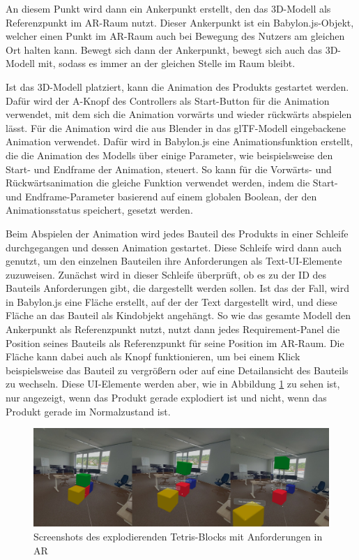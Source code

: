 An diesem Punkt wird dann ein Ankerpunkt erstellt, den das 3D-Modell als Referenzpunkt im AR-Raum nutzt.
Dieser Ankerpunkt ist ein Babylon.js-Objekt, welcher einen Punkt im AR-Raum auch bei Bewegung des Nutzers am gleichen Ort halten kann.
Bewegt sich dann der Ankerpunkt, bewegt sich auch das 3D-Modell mit, sodass es immer an der gleichen Stelle im Raum bleibt.


Ist das 3D-Modell platziert, kann die Animation des Produkts gestartet werden.
Dafür wird der A-Knopf des Controllers als Start-Button für die Animation verwendet, mit dem sich die Animation vorwärts und wieder rückwärts abspielen lässt.
Für die Animation wird die aus Blender in das glTF-Modell eingebackene Animation verwendet.
Dafür wird in Babylon.js eine Animationsfunktion erstellt, die die Animation des Modells über einige Parameter, wie beispielsweise den Start- und Endframe der Animation, steuert.
So kann für die Vorwärts- und Rückwärtsanimation die gleiche Funktion verwendet werden, indem die Start- und Endframe-Parameter basierend auf einem globalen Boolean, der den Animationsstatus speichert, gesetzt werden.

Beim Abspielen der Animation wird jedes Bauteil des Produkts in einer Schleife durchgegangen und dessen Animation gestartet.
Diese Schleife wird dann auch genutzt, um den einzelnen Bauteilen ihre Anforderungen als Text-UI-Elemente zuzuweisen.
Zunächst wird in dieser Schleife überprüft, ob es zu der ID des Bauteils Anforderungen gibt, die dargestellt werden sollen.
Ist das der Fall, wird in Babylon.js eine Fläche erstellt, auf der der Text dargestellt wird, und diese Fläche an das Bauteil als Kindobjekt angehängt.
So wie das gesamte Modell den Ankerpunkt als Referenzpunkt nutzt, nutzt dann jedes Requirement-Panel die Position seines Bauteils als Referenzpunkt für seine Position im AR-Raum.
Die Fläche kann dabei auch als Knopf funktionieren, um bei einem Klick beispielsweise das Bauteil zu vergrößern oder auf eine Detailansicht des Bauteils zu wechseln.
Diese UI-Elemente werden aber, wie in Abbildung \ref{fig:tetris-explosion} zu sehen ist, nur angezeigt, wenn das Produkt gerade \glqq{}explodiert\grqq{} ist und nicht, wenn das Produkt gerade im Normalzustand ist.

\begin{figure}[H]
    \centering
    \includegraphics[width=1\textwidth]{images/tetris-explosion.png}
    \caption{Screenshots des explodierenden Tetris-Blocks mit Anforderungen in AR}
    \label{fig:tetris-explosion}
\end{figure}

